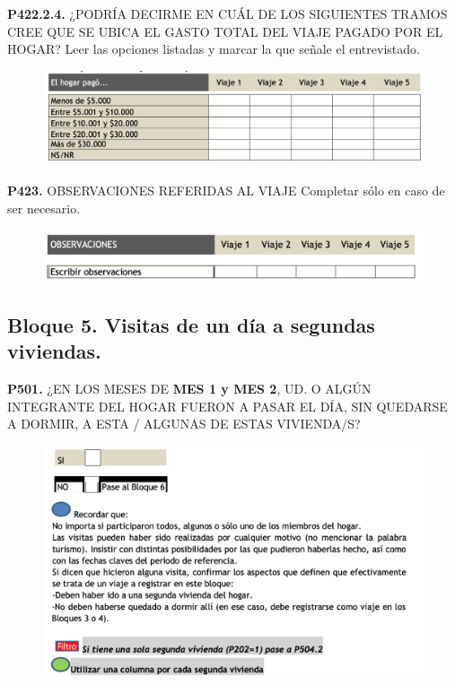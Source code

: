 \documentclass[
  openany]{book}
\begin{document}
\textbf{P422.2.4.} ¿PODRÍA DECIRME EN CUÁL DE LOS SIGUIENTES TRAMOS CREE QUE SE UBICA EL GASTO TOTAL DEL VIAJE PAGADO POR EL HOGAR?
Leer las opciones listadas y marcar la que señale el entrevistado.

\begin{figure}

{\centering \includegraphics[width=1\linewidth]{imagenes/figura6-189} 

}

\end{figure}

\textbf{P423.} OBSERVACIONES REFERIDAS AL VIAJE
Completar sólo en caso de ser necesario.

\begin{figure}

{\centering \includegraphics[width=1\linewidth]{imagenes/figura6-190} 

}

\end{figure}

\hypertarget{bloque-5.-visitas-de-un-duxeda-a-segundas-viviendas.}{%
\subsection{Bloque 5. Visitas de un día a segundas viviendas.}\label{bloque-5.-visitas-de-un-duxeda-a-segundas-viviendas.}}

\textbf{P501.} ¿EN LOS MESES DE \textbf{MES 1 y MES 2}, UD. O ALGÚN INTEGRANTE DEL HOGAR FUERON A PASAR EL DÍA, SIN QUEDARSE A DORMIR, A ESTA / ALGUNAS DE ESTAS VIVIENDA/S?

\begin{figure}

{\centering \includegraphics[width=1\linewidth]{imagenes/figura6-191} 

}

\end{figure}
\end{document}
